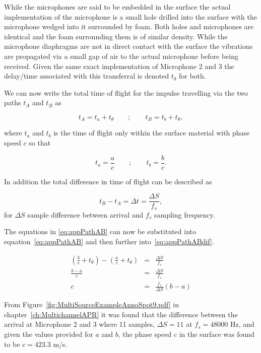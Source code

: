 While the microphones are said to be embedded in the surface the actual implementation of the microphone is a small hole drilled into the surface with the microphone wedged into it surrounded by foam. Both holes and microphones are identical and the foam surrounding them is of similar density. While the microphone diaphragms are not in direct contact with the surface the vibrations are propagated via a small gap of air to the actual microphone before being received. Given the same exact implementation of Microphone 2 and 3 the delay/time associated with this transferral is denoted $t_\theta$ for both.

We can now write the total time of flight for the impulse travelling via the two paths $t_A$ and $t_B$ as

\begin{equation}\label{eq:appPathAB}
t_A = t_a + t_\theta \qquad ; \qquad t_B = t_b + t_\theta,
\end{equation}

where $t_a$ and $t_b$ is the time of flight only within the surface material with phase speed $c$ so that

\begin{equation}\label{eq:appPathABSpeed}
t_a = \frac{a}{c} \qquad ; \qquad t_b = \frac{b}{c}.
\end{equation}

In addition the total difference in time of flight can be described as

\begin{equation}\label{eq:appPathABdif}
t_B - t_A = \Delta t = \frac{\Delta S}{f_s},
\end{equation}
for $\Delta S$ sample difference between arrival and $f_s$ sampling frequency.

The equations in \ref{eq:appPathAB} can now be substituted into equation~\ref{eq:appPathAB} and then further into~\ref{eq:appPathABdif}.

\begin{eqnarray}
\nonumber   \left(\frac{b}{c} + t_\theta\right) - \left(\frac{a}{c} + t_\theta\right) &=& \frac{\Delta S}{f_s} \\
\nonumber   \frac{b-a}{c} &=& \frac{\Delta S}{f_s} \\
            c &=& \frac{f_s}{\Delta S} \left( b-a \right)
\end{eqnarray}

From Figure~\ref{fig:MultiSourceExampleAnnoSpot9.pdf} in chapter~\ref{ch:MultichannelAPR} it was found that the difference between the arrival at Microphone 2 and 3 where 11 samples, $\Delta S = 11$ at $f_s = 48000$ Hz, and given the values provided for $a$ and $b$, the phase speed $c$ in the surface was found to be $c = 423.3 $ m/s.



